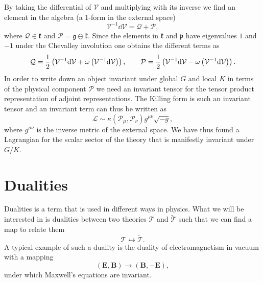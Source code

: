 By taking the differential of $\mathcal{V}$ and multiplying with its inverse we find an element in the algebra (a 1-form in the external space)
\begin{equation}
    \mathcal{V}^{-1}\dd \mathcal{V} = \mathcal{Q}+\mathcal{P},
\end{equation}
where $\mathcal{Q}\in\mathfrak{k}$ and $\mathcal{P}=\mathfrak{g}\ominus\mathfrak{k}$. Since the elements in $\mathfrak{k}$ and $\mathfrak{p}$ have eigenvalues $1$ and $-1$ under the Chevalley involution one obtains the different terms as
\begin{equation}
    \mathcal{Q} = \frac{1}{2}\left(\mathcal{V}^{-1}\mathrm{d} \mathcal{V}+\omega\left(\mathcal{V}^{-1}\mathrm{d} \mathcal{V}\right)\right),\\\qquad \mathcal{P} = \frac{1}{2}\left(\mathcal{V}^{-1}\mathrm{d} \mathcal{V}-\omega\left(\mathcal{V}^{-1}\mathrm{d} \mathcal{V}\right)\right).
\end{equation}
In order to write down an object invariant under global $G$ and local $K$ in terms of the physical component $\mathcal{P}$ we need an invariant tensor for the tensor product representation of adjoint representations. The Killing form is such an invariant tensor and an invariant term can thus be written as 
\begin{equation}
    \mathcal{L} \sim \kappa(\mathcal{P}_\mu,\mathcal{P}_\nu)g^{\mu\nu}\sqrt{-g},
\end{equation}
where $g^{\mu\nu}$ is the inverse metric of the external space. We have thus found a Lagrangian for the scalar sector of the theory that is manifestly invariant under $G/K$. 


\section{Dualities}\label{sec:Dualities}
Dualities is a term that is used in different ways in physics. What we will be interested in is dualities between two theories $\mathscr{T}$ and $\tilde{\mathscr{T}}$ such that we can find a map to relate them 
\begin{equation}
    \mathscr{T} \leftrightarrow \mathscr{\tilde{T}}.
\end{equation}
A typical example of such a duality is the duality of electromagnetism in vacuum with a mapping 
\begin{equation}
    \left(\mathbf{E},\mathbf{B}\right) \to \left(\mathbf{B},-\mathbf{E}\right),
\end{equation}
under which Maxwell's equations are invariant. 

